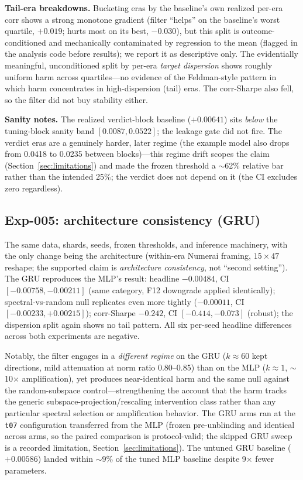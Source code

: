 \textbf{Tail-era breakdowns.} Bucketing eras by the baseline's own realized
per-era corr shows a strong monotone gradient (filter ``helps'' on the
baseline's worst quartile, $+0.019$; hurts most on its best, $-0.030$), but
this split is outcome-conditioned and mechanically contaminated by
regression to the mean (flagged in the analysis code before results); we
report it as descriptive only. The evidentially meaningful, unconditioned
split by per-era \emph{target dispersion} shows roughly uniform harm across
quartiles---no evidence of the Feldman-style pattern
\citep{feldman2019longtailmemorization} in which harm concentrates in
high-dispersion (tail) eras. The corr-Sharpe also fell, so the filter did
not buy stability either.

\textbf{Sanity notes.} The realized verdict-block baseline ($+0.00641$)
sits \emph{below} the tuning-block sanity band $[0.0087, 0.0522]$; the
leakage gate did not fire. The verdict eras are a genuinely harder, later
regime (the example model also drops from 0.0418 to 0.0235 between
blocks)---this regime drift scopes the claim
(Section~\ref{sec:limitations}) and made the frozen threshold a $\sim$62\%
relative bar rather than the intended 25\%; the verdict does not depend on
it (the CI excludes zero regardless).

\subsection{Exp-005: architecture consistency (GRU)}
\label{sec:exp005}

The same data, shards, seeds, frozen thresholds, and inference machinery,
with the only change being the architecture (within-era Numerai framing,
$15 \times 47$ reshape; the supported claim is \emph{architecture
consistency}, not ``second setting''). The GRU reproduces the MLP's result:
headline $-0.00484$, CI $[-0.00758, -0.00211]$ (same category, F12
downgrade applied identically); spectral-vs-random null replicates even
more tightly ($-0.00011$, CI $[-0.00233, +0.00215]$); corr-Sharpe
$-0.242$, CI $[-0.414, -0.073]$ (robust); the dispersion split again shows
no tail pattern. All six per-seed headline differences across both
experiments are negative.

Notably, the filter engages in a \emph{different regime} on the GRU
($k \approx 60$ kept directions, mild attenuation at norm ratio
0.80--0.85) than on the MLP ($k \approx 1$, $\sim$10$\times$
amplification), yet produces near-identical harm and the same null against
the random-subspace control---strengthening the account that the harm
tracks the generic subspace-projection/rescaling intervention class rather
than any particular spectral selection or amplification behavior. The GRU
arms ran at the \texttt{t07} configuration transferred from the MLP
(frozen pre-unblinding and identical across arms, so the paired comparison
is protocol-valid; the skipped GRU sweep is a recorded limitation,
Section~\ref{sec:limitations}). The untuned GRU baseline ($+0.00586$)
landed within $\sim$9\% of the tuned MLP baseline despite 9$\times$ fewer
parameters.


